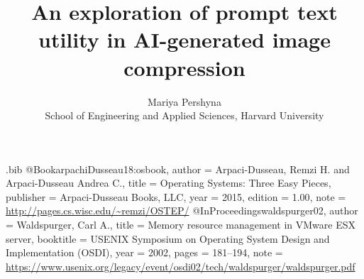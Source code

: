 \usepackage{tikz}
\usepackage{amsmath}

\usepackage{filecontents}

\usepackage{subcaption}
\usepackage{float}

\begin{filecontents}{\jobname.bib}
@Book{arpachiDusseau18:osbook,
  author =       {Arpaci-Dusseau, Remzi H. and Arpaci-Dusseau Andrea C.},
  title =        {Operating Systems: Three Easy Pieces},
  publisher =    {Arpaci-Dusseau Books, LLC},
  year =         2015,
  edition =      {1.00},
  note =         {\url{http://pages.cs.wisc.edu/~remzi/OSTEP/}}
}
@InProceedings{waldspurger02,
  author =       {Waldspurger, Carl A.},
  title =        {Memory resource management in {VMware ESX} server},
  booktitle =    {USENIX Symposium on Operating System Design and
                  Implementation (OSDI)},
  year =         2002,
  pages =        {181--194},
  note =         {\url{https://www.usenix.org/legacy/event/osdi02/tech/waldspurger/waldspurger.pdf}}}
\end{filecontents}



\date{}

\title{\Large \bf An exploration of prompt text utility in AI-generated image compression}

\author{
{\rm Mariya Pershyna}\\
School of Engineering and Applied Sciences, Harvard University
} %

\maketitle


